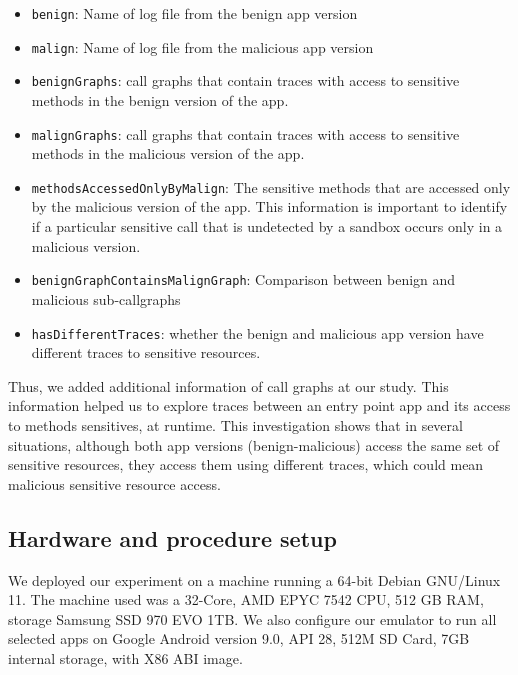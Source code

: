 \begin{itemize}
\item \texttt{benign}: Name of log file from the benign app version
\item \texttt{malign}: Name of log file from the malicious app version
\item \texttt{benignGraphs}: call graphs that contain traces with access to sensitive methods in the benign version of the app.
\item \texttt{malignGraphs}: call graphs that contain traces with access to sensitive methods in the malicious version of the app.
\item \texttt{methodsAccessedOnlyByMalign}: The sensitive methods that are accessed only by the malicious version of the app. This information is important to identify if a particular sensitive call that is undetected by a sandbox occurs only in a malicious version.
\item \texttt{benignGraphContainsMalignGraph}: Comparison between benign and malicious sub-callgraphs
\item \texttt{hasDifferentTraces}: whether the benign and malicious app version have different traces to sensitive resources. 
\end{itemize}

Thus, we added additional information of call graphs at our study. This information helped us to explore traces between an entry point app and its access to methods sensitives, at runtime. This investigation shows that in several situations, although both app versions (benign-malicious) access the same set of sensitive resources, they access them using different traces, which could mean malicious sensitive resource access.

\subsection{Hardware and procedure setup}\label{sec:hardware}

We deployed our experiment on a machine running a 64-bit Debian  GNU/Linux 11. The machine used was  a 32-Core, AMD EPYC 7542 CPU, 512 GB RAM, storage Samsung SSD 970 EVO 1TB. We also configure our emulator to run all selected apps on Google Android version 9.0, API 28, 512M SD Card, 7GB internal storage, with X86 ABI image.


